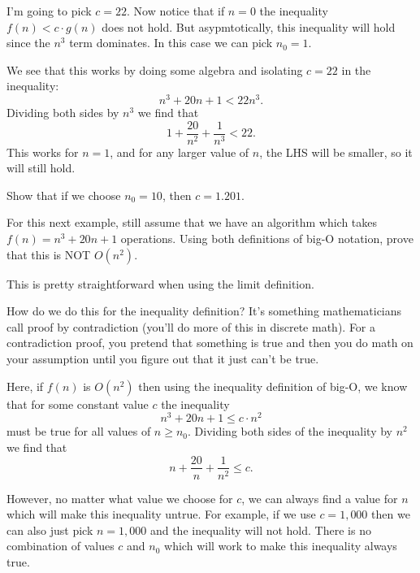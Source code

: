 \documentclass{article}
\theoremstyle{definition}
\numberwithin{equation}{section}
\begin{document}
I'm going to pick $c=22$. Now notice that if $n=0$ the inequality $f(n)<c\cdot g(n)$ does not hold. But asypmtotically, this inequality will hold since the $n^3$ term dominates. In this case we can pick $n_0=1$. 

We see that this works by doing some algebra and isolating $c=22$ in the inequality:
\[n^3+20n+1<22n^3.\]
Dividing both sides by $n^3$ we find that 
\[1+\frac{20}{n^2}+\frac{1}{n^3}<22.\]
This works for $n=1$, and for any larger value of $n$, the LHS will be smaller, so it will still hold.

Show that if we choose $n_0=10$, then $c=1.201$.

\vspace{0.2in}

For this next example, still assume that we have an algorithm which takes $f(n)=n^3+20n+1$ operations. Using both definitions of big-O notation, prove that this is NOT $O(n^2)$.

This is pretty straightforward when using the limit definition.

How do we do this for the inequality definition? It's something mathematicians call proof by contradiction (you'll do more of this in discrete math). For a contradiction proof, you pretend that something is true and then you do math on your assumption until you figure out that it just can't be true.

Here, if $f(n)$ is $O(n^2)$ then using the inequality definition of big-O, we know that for some constant value $c$ the inequality 
\[n^3+20n+1\leq c\cdot n^2\]
must be true for all values of $n\geq n_0$. 
Dividing both sides of the inequality by $n^2$ we find that
\[n+\frac{20}{n}+\frac{1}{n^2}\leq c.\]

However, no matter what value we choose for $c$, we can always find a value for $n$ which will make this inequality untrue. For example, if we use $c=1,000$ then we can also just pick $n=1,000$ and the inequality will not hold. There is no combination of values $c$ and $n_0$ which will work to make this inequality always true.
\end{document}
